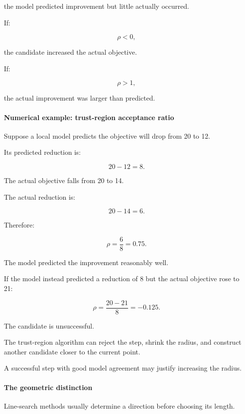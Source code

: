 the model predicted improvement but little actually occurred.

If:

\[
\rho<0,
\]

the candidate increased the actual objective.

If:

\[
\rho>1,
\]

the actual improvement was larger than predicted.

\paragraph{Numerical example: trust-region acceptance ratio}\label{02-foundations-ii-ch026-numerical-example-trust-region-acceptance-ratio}

\hypertarget{02-foundations-ii-ch026-numerical-example-trust-region-acceptance-ratio}{}

Suppose a local model predicts the objective will drop from 20 to 12.

Its predicted reduction is:

\[
20-12=8.
\]

The actual objective falls from 20 to 14.

The actual reduction is:

\[
20-14=6.
\]

Therefore:

\[
\rho=\frac68=\boxed{0.75}.
\]

The model predicted the improvement reasonably well.

If the model instead predicted a reduction of 8 but the actual objective rose to 21:

\[
\rho=\frac{20-21}{8}=-0.125.
\]

The candidate is unsuccessful.

The trust-region algorithm can reject the step, shrink the radius, and construct another candidate closer to the current point.

A successful step with good model agreement may justify increasing the radius.

\paragraph{The geometric distinction}\label{02-foundations-ii-ch026-the-geometric-distinction}

\hypertarget{02-foundations-ii-ch026-the-geometric-distinction}{}

Line-search methods usually determine a direction before choosing its length.


